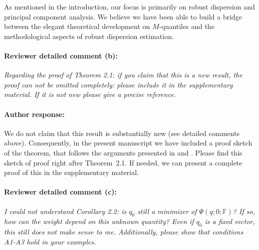 \documentclass[11pt,letterpaper]{article}
\newcommand{\BF}{{\mathbb{F}}}
\theoremstyle{definition} \newtheorem{Definition}[Theorem]{Definition}
\begin{document}
As mentioned in the introduction, our focus is primarily on robust dispersion and principal component analysis. We believe we have been able to build a bridge between the 
elegant theoretical development on $M$-quantiles and the methodological aspects of robust dispersion estimation. 



 
%

\paragraph{Reviewer detailed comment (b):}
\textit{Regarding the proof of Theorem 2.1: if you claim that this is a new result, the proof can not be omitted completely: please include it in the supplementary material. If it is not new please give a precise reference.}

\paragraph{Author response:}
We do not claim that this result is substantially new (see detailed comments above). Consequently, in the present manuscript we have included a proof sketch of the theorem, that follows the arguments presented in \cite{ref:AoS921514_Niemiro} and \cite{ref:AoS891631_Haberman}. Please find this sketch of proof right after Theorem~2.1. If needed, we can present a complete proof of this in the supplementary material. 


\paragraph{Reviewer detailed comment (c):}
\textit{I could not understand Corollary 2.2: is $q_0$ still a minimizer of $\Psi(q; 0; \BF)$? If so, how can the weight depend on this unknown quantity? Even if $q_0$ is a fixed vector, this still does not make sense to me. Additionally, please show that conditions A1-A3 hold in your examples.
}
\end{document}
